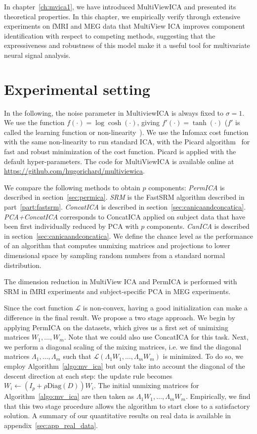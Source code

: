 In chapter~\ref{ch:mvica1}, we have introduced MultiViewICA and presented its
theoretical properties.
In this chapter, we empirically verify through extensive experiments on fMRI and
MEG data that MultiView ICA improves component identification with respect to competing methods, suggesting that the expressiveness and robustness of this model make it a useful tool for multivariate neural signal analysis.

\section{Experimental setting}
\label{sec:expts}
In the following, the noise parameter in MultiviewICA is always fixed to $\sigma =1$.
We use the function $f(\cdot)= \log\cosh(\cdot)$, giving $f'(\cdot) =
\tanh(\cdot)$ ($f'$ is called the learning function or non-linearity~\cite{hyvarinen1998independent}).
We use the Infomax cost function~\cite{bell1995information} with the same non-linearity to run standard ICA, with the Picard algorithm~\cite{ablin2018faster} for fast and robust minimization of the cost function. Picard is applied with the default hyper-parameters.
The code for MultiViewICA is available online at \url{https://github.com/hugorichard/multiviewica}.
%

We compare the following methods to obtain $p$ components:
\emph{PermICA} is described in section~\ref{sec:permica}.
%
\emph{SRM} is the FastSRM algorithm described in part~\ref{part:fastsrm}.
%
\emph{ConcatICA} is described in section~\ref{sec:canicaandconcatica}.
%
\emph{PCA+ConcatICA} corresponds to ConcatICA applied on subject data that have been first individually reduced by PCA with $p$ components. 
%
\emph{CanICA} is described in section~\ref{sec:canicaandconcatica}.
We define the chance level as the performance of an algorithm that computes unmixing matrices and projections to lower dimensional space by sampling random numbers from a standard normal distribution. 
% 


The dimension reduction in MultiView ICA and PermICA is performed with SRM in
fMRI experiments and subject-specific PCA in MEG experiments.

Since the cost function $\mathcal{L}$ is non-convex, having a good initialization can make a difference in the final result. We propose a two stage approach.
We begin by applying PermICA on the datasets, which gives us a first set of unimixing matrices $W_1, \dots, W_m$.
Note that we could also use ConcatICA for this task.
Next, we perform a diagonal scaling of the mixing matrices, i.e. we find the diagonal matrices $\Lambda_1, \dots, \Lambda_m$ such that $\mathcal{L}(\Lambda_1W_1, \dots, \Lambda_mW_m)$ is minimized.
To do so, we employ Algorithm~\ref{algo:mv_ica} but only take into account the diagonal of the descent direction at each step: the update rule becomes $W_i \leftarrow (I_p + \rho \text{Diag}(D))W_i$.
The initial unmixing matrices for Algorithm~\ref{algo:mv_ica} are then taken as $\Lambda_1W_1, \dots, \Lambda_mW_m$.
Empirically, we find that this two stage procedure allows the algorithm to start close to a satisfactory solution.
A summary of our quantitative results on real data is available in appendix~\ref{sec:app_real_data}.


